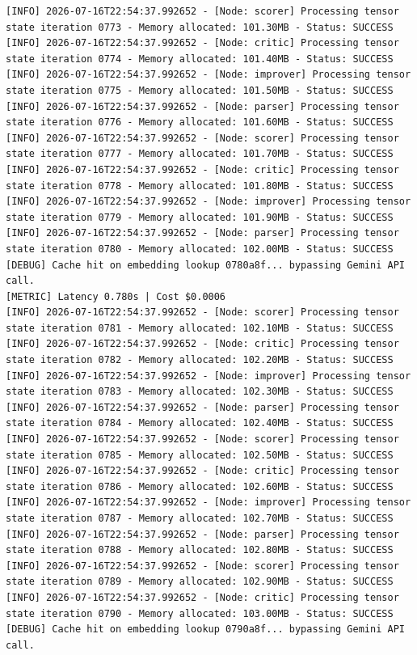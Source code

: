 \documentclass[10pt,journal,compsoc]{IEEEtran}
\begin{document}
\begin{verbatim}
[INFO] 2026-07-16T22:54:37.992652 - [Node: scorer] Processing tensor state iteration 0773 - Memory allocated: 101.30MB - Status: SUCCESS
[INFO] 2026-07-16T22:54:37.992652 - [Node: critic] Processing tensor state iteration 0774 - Memory allocated: 101.40MB - Status: SUCCESS
[INFO] 2026-07-16T22:54:37.992652 - [Node: improver] Processing tensor state iteration 0775 - Memory allocated: 101.50MB - Status: SUCCESS
[INFO] 2026-07-16T22:54:37.992652 - [Node: parser] Processing tensor state iteration 0776 - Memory allocated: 101.60MB - Status: SUCCESS
[INFO] 2026-07-16T22:54:37.992652 - [Node: scorer] Processing tensor state iteration 0777 - Memory allocated: 101.70MB - Status: SUCCESS
[INFO] 2026-07-16T22:54:37.992652 - [Node: critic] Processing tensor state iteration 0778 - Memory allocated: 101.80MB - Status: SUCCESS
[INFO] 2026-07-16T22:54:37.992652 - [Node: improver] Processing tensor state iteration 0779 - Memory allocated: 101.90MB - Status: SUCCESS
[INFO] 2026-07-16T22:54:37.992652 - [Node: parser] Processing tensor state iteration 0780 - Memory allocated: 102.00MB - Status: SUCCESS
[DEBUG] Cache hit on embedding lookup 0780a8f... bypassing Gemini API call.
[METRIC] Latency 0.780s | Cost $0.0006
[INFO] 2026-07-16T22:54:37.992652 - [Node: scorer] Processing tensor state iteration 0781 - Memory allocated: 102.10MB - Status: SUCCESS
[INFO] 2026-07-16T22:54:37.992652 - [Node: critic] Processing tensor state iteration 0782 - Memory allocated: 102.20MB - Status: SUCCESS
[INFO] 2026-07-16T22:54:37.992652 - [Node: improver] Processing tensor state iteration 0783 - Memory allocated: 102.30MB - Status: SUCCESS
[INFO] 2026-07-16T22:54:37.992652 - [Node: parser] Processing tensor state iteration 0784 - Memory allocated: 102.40MB - Status: SUCCESS
[INFO] 2026-07-16T22:54:37.992652 - [Node: scorer] Processing tensor state iteration 0785 - Memory allocated: 102.50MB - Status: SUCCESS
[INFO] 2026-07-16T22:54:37.992652 - [Node: critic] Processing tensor state iteration 0786 - Memory allocated: 102.60MB - Status: SUCCESS
[INFO] 2026-07-16T22:54:37.992652 - [Node: improver] Processing tensor state iteration 0787 - Memory allocated: 102.70MB - Status: SUCCESS
[INFO] 2026-07-16T22:54:37.992652 - [Node: parser] Processing tensor state iteration 0788 - Memory allocated: 102.80MB - Status: SUCCESS
[INFO] 2026-07-16T22:54:37.992652 - [Node: scorer] Processing tensor state iteration 0789 - Memory allocated: 102.90MB - Status: SUCCESS
[INFO] 2026-07-16T22:54:37.992652 - [Node: critic] Processing tensor state iteration 0790 - Memory allocated: 103.00MB - Status: SUCCESS
[DEBUG] Cache hit on embedding lookup 0790a8f... bypassing Gemini API call.

\end{verbatim}
\end{document}
